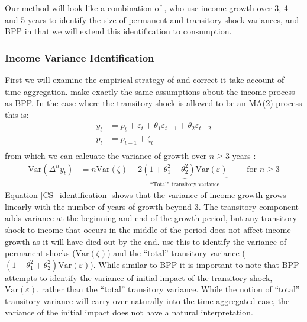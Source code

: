 \documentclass[titlepage]{\econtex}\newcommand{\texname}{IncomeUncertainty}
\begin{document}
Our method will look like a combination of \cite{carroll_nature_1997}, who use income growth over 3, 4 and 5 years to identify the size of permanent and transitory shock  variances, and BPP in that we will extend this identification to consumption.

\subsubsection{\cite{carroll_nature_1997} Income Variance Identification}
First we will examine the empirical strategy of \cite{carroll_nature_1997} and correct it take account of time aggregation. \cite{carroll_nature_1997} make exactly the same assumptions about the income process as BPP. In the case where the transitory shock is allowed to be an MA(2) process this is:
	\begin{align*}
	y_t &= p_t + \varepsilon_t + \theta_1 \varepsilon_{t-1} + \theta_2 \varepsilon_{t-2} \\
	p_t &= p_{t-1} +\zeta_t\\
	\end{align*}
from which we can calcuate the variance of growth over $n \geq 3$ years :
	\begin{align}
	\mathrm{Var}(\Delta^n y_t) &= n \mathrm{Var}(\zeta) + 2\underbrace{(1+\theta_1^2 + \theta_2^2)\mathrm{Var}(\varepsilon)}_\text{``Total'' transitory variance} \qquad \text{ for $n \geq 3$} \label{CS_identification}
	\end{align}
Equation \ref{CS_identification} shows that the variance of income growth grows linearly with the number of years of growth beyond 3. The transitory component adds variance at the beginning and end of the growth period, but any transitory shock to income that occurs in the middle of the period does not affect income growth as it will have died out by the end. \cite{carroll_nature_1997} use this to identify the variance of permanent shocks ($\mathrm{Var}(\zeta)$) and the ``total'' transitory variance ($(1+\theta_1^2 + \theta_2^2)\mathrm{Var}(\varepsilon)$). While similar to BPP it is important to note that BPP attempts to identify the variance of initial impact of the transitory shock, $\mathrm{Var}(\varepsilon)$, rather than the ``total'' transitory variance. While the notion of ``total'' transitory variance will carry over naturally into the time aggregated case, the variance of the initial impact does not have a natural interpretation.
\end{document}
